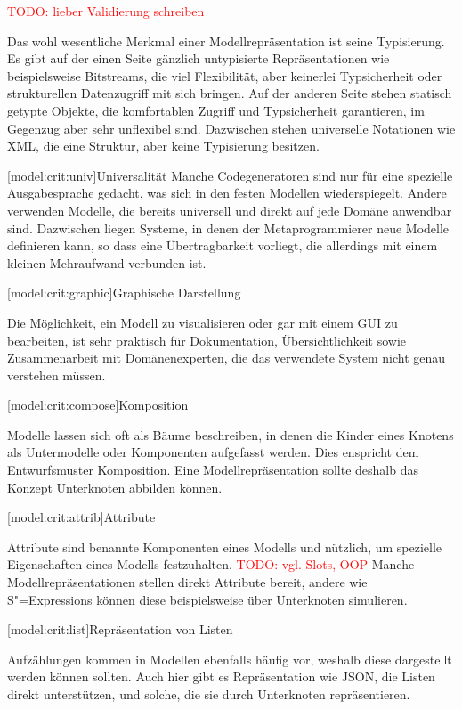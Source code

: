 \documentclass[11pt, a4paper, bibgerm]{scrbook}
\newcommand{\todo}[1]{
  \textcolor{red}{TODO: #1}
}
\newcommand\lsubsection{}
\newcommand{\sexps}{S"=Expressions}
\begin{document}
\todo{lieber Validierung schreiben}

Das wohl wesentliche Merkmal einer Modellrepräsentation ist seine
Typisierung. Es gibt auf der einen Seite gänzlich untypisierte
Repräsentationen wie beispielsweise Bitstreams, die viel Flexibilität,
aber keinerlei Typsicherheit oder strukturellen Datenzugriff mit sich
bringen. Auf der anderen Seite stehen statisch getypte Objekte, die
komfortablen Zugriff und Typsicherheit garantieren, im Gegenzug aber
sehr unflexibel sind. Dazwischen stehen universelle Notationen wie XML,
die eine Struktur, aber keine Typisierung besitzen.

\lsubsection[model:crit:univ]{Universalität} Manche
Codegeneratoren sind nur für eine spezielle Ausgabesprache gedacht, was
sich in den festen Modellen wiederspiegelt. Andere verwenden Modelle,
die bereits universell und direkt auf jede Domäne anwendbar
sind. Dazwischen liegen Systeme, in denen der Metaprogrammierer neue
Modelle definieren kann, so dass eine Übertragbarkeit vorliegt, die
allerdings mit einem kleinen Mehraufwand verbunden ist.

\lsubsection[model:crit:graphic]{Graphische Darstellung}

Die Möglichkeit, ein Modell zu visualisieren oder gar mit einem GUI zu
bearbeiten, ist sehr praktisch für Dokumentation, Übersichtlichkeit
sowie Zusammenarbeit mit Domänenexperten, die das verwendete System
nicht genau verstehen müssen.

\lsubsection[model:crit:compose]{Komposition}

Modelle lassen sich oft als Bäume beschreiben, in denen die Kinder eines
Knotens als Untermodelle oder Komponenten aufgefasst werden. Dies
enspricht dem Entwurfsmuster Komposition\cite[S.182f]{CompositePattern}. Eine
Modellrepräsentation sollte deshalb das Konzept Unterknoten abbilden
können.

\lsubsection[model:crit:attrib]{Attribute}

Attribute sind benannte Komponenten eines Modells und nützlich, um
spezielle Eigenschaften eines Modells festzuhalten. \todo{vgl. Slots,
  OOP} Manche Modellrepräsentationen stellen direkt Attribute bereit,
andere wie \sexps{} können diese beispielsweise über Unterknoten
simulieren.

\lsubsection[model:crit:list]{Repräsentation von Listen}

Aufzählungen kommen in Modellen ebenfalls häufig vor, weshalb diese
dargestellt werden können sollten. Auch hier gibt es Repräsentation wie
JSON, die Listen direkt unterstützen, und solche, die sie durch
Unterknoten repräsentieren.
\end{document}
